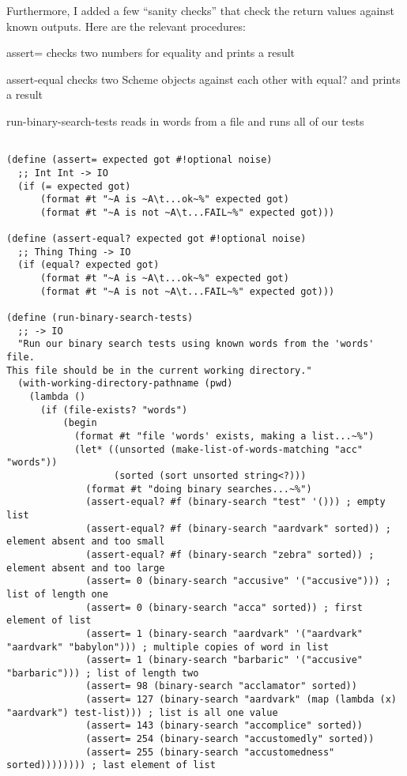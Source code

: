 \documentclass[12pt,openright,draft]{book}
\begin{document}
Furthermore, I added a few ``sanity checks'' that check the return values against known outputs. Here are the relevant procedures: 

assert= checks two numbers for equality and prints a result 

assert-equal checks two Scheme objects against each other with equal? and prints a result 

run-binary-search-tests reads in words from a file and runs all of our tests 

\begin{verbatim}

(define (assert= expected got #!optional noise)
  ;; Int Int -> IO
  (if (= expected got)
      (format #t "~A is ~A\t...ok~%" expected got)
      (format #t "~A is not ~A\t...FAIL~%" expected got)))

(define (assert-equal? expected got #!optional noise)
  ;; Thing Thing -> IO
  (if (equal? expected got)
      (format #t "~A is ~A\t...ok~%" expected got)
      (format #t "~A is not ~A\t...FAIL~%" expected got)))

(define (run-binary-search-tests)
  ;; -> IO
  "Run our binary search tests using known words from the 'words' file.
This file should be in the current working directory."
  (with-working-directory-pathname (pwd)
    (lambda ()
      (if (file-exists? "words")
          (begin
            (format #t "file 'words' exists, making a list...~%")
            (let* ((unsorted (make-list-of-words-matching "acc" "words"))
                   (sorted (sort unsorted string<?)))
              (format #t "doing binary searches...~%")
              (assert-equal? #f (binary-search "test" '())) ; empty list
              (assert-equal? #f (binary-search "aardvark" sorted)) ; element absent and too small
              (assert-equal? #f (binary-search "zebra" sorted)) ; element absent and too large
              (assert= 0 (binary-search "accusive" '("accusive"))) ; list of length one
              (assert= 0 (binary-search "acca" sorted)) ; first element of list
              (assert= 1 (binary-search "aardvark" '("aardvark" "aardvark" "babylon"))) ; multiple copies of word in list
              (assert= 1 (binary-search "barbaric" '("accusive" "barbaric"))) ; list of length two
              (assert= 98 (binary-search "acclamator" sorted))
              (assert= 127 (binary-search "aardvark" (map (lambda (x) "aardvark") test-list))) ; list is all one value
              (assert= 143 (binary-search "accomplice" sorted))
              (assert= 254 (binary-search "accustomedly" sorted))
              (assert= 255 (binary-search "accustomedness" sorted)))))))) ; last element of list
\end{verbatim}
\end{document}
